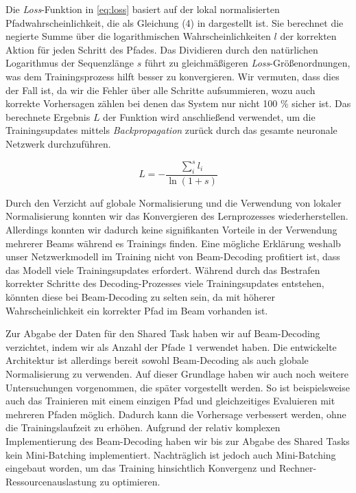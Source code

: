 \documentclass[a4paper]{article}
\begin{document}
Die \textit{Loss}-Funktion in \autoref{eq:loss} basiert auf der lokal normalisierten Pfadwahrscheinlichkeit, die als Gleichung (4) in \citet{globalnorm:AndorAWSPGPC16} dargestellt ist.
Sie berechnet die negierte Summe über die logarithmischen Wahrscheinlichkeiten $l$ der korrekten Aktion für jeden Schritt des Pfades.
Das Dividieren durch den natürlichen Logarithmus der Sequenzlänge $s$ führt zu gleichmäßigeren \textit{Loss}-Größenordnungen, was dem Trainingsprozess hilft besser zu konvergieren.
Wir vermuten, dass dies der Fall ist, da wir die Fehler über alle Schritte aufsummieren, wozu auch korrekte Vorhersagen zählen bei denen das System nur nicht 100 \% sicher ist.
Das berechnete Ergebnis $L$ der Funktion wird anschließend verwendet, um die Trainingsupdates mittels \textit{Backpropagation} zurück durch das gesamte neuronale Netzwerk durchzuführen.


\begin{equation}
\label{eq:loss}
L = - \frac{\sum_i^s l_i}{\ln{(1+s)}}
\end{equation}


Durch den Verzicht auf globale Normalisierung und die Verwendung von lokaler Normalisierung konnten wir das Konvergieren des Lernprozesses wiederherstellen. Allerdings konnten wir dadurch keine signifikanten Vorteile in der Verwendung mehrerer Beams während es Trainings finden.
Eine mögliche Erklärung weshalb unser Netzwerkmodell im Training nicht von Beam-Decoding profitiert ist, dass das Modell viele Trainingsupdates erfordert.
Während durch das Bestrafen korrekter Schritte des Decoding-Prozesses viele Trainingsupdates entstehen, könnten diese bei Beam-Decoding zu selten sein, da mit höherer Wahrscheinlichkeit ein korrekter Pfad im Beam vorhanden ist.


Zur Abgabe der Daten für den Shared Task haben wir auf Beam-Decoding verzichtet, indem wir als Anzahl der Pfade $1$ verwendet haben.
Die entwickelte Architektur ist allerdings bereit sowohl Beam-Decoding als auch globale Normalisierung zu verwenden.
Auf dieser Grundlage haben wir auch noch weitere Untersuchungen vorgenommen, die später vorgestellt werden.
So ist beispielsweise auch das Trainieren mit einem einzigen Pfad und gleichzeitiges Evaluieren mit mehreren Pfaden möglich. Dadurch kann die Vorhersage verbessert werden, ohne die Trainingslaufzeit zu erhöhen.
Aufgrund der relativ komplexen Implementierung des Beam-Decoding haben wir bis zur Abgabe des Shared Tasks kein Mini-Batching implementiert. Nachträglich ist jedoch auch Mini-Batching eingebaut worden, um das Training hinsichtlich Konvergenz und Rechner-Ressourcenauslastung zu optimieren.
\end{document}
